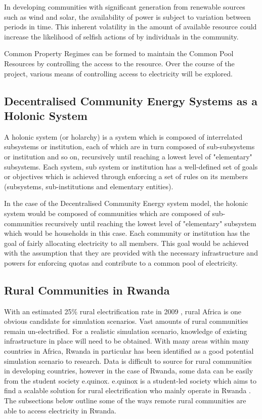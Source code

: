 \documentclass{article}
\begin{document}
In developing communities with significant generation from renewable sources such as wind and solar, the availability of power is subject to variation between periods in time. This inherent volatility in the amount of available resource could increase the likelihood of selfish actions of by individuals in the community.

Common Property Regimes can be formed to maintain the Common Pool Resources by controlling the access to the resource. Over the course of the project, various means of controlling access to electricity will be explored. 

\subsection{Decentralised Community Energy Systems as a Holonic System}
A holonic system (or holarchy) is a system which is composed of interrelated subsystems or institution, each of which are in turn composed of sub-subsystems  or institution and so on, recursively until reaching a lowest level of "elementary" subsystems. Each system, sub system or institution has a well-defined set of goals or objectives which is achieved through enforcing a set of rules on its members (subsystems, sub-institutions and elementary entities). 

In the case of the Decentralised Community Energy system model, the holonic system would be composed of communities which are composed of sub-communities recursively until reaching the lowest level of "elementary" subsystem which would be households in this case. Each community or institution has the goal of fairly allocating electricity to all members. This goal would be achieved with the assumption that they are provided with the necessary infrastructure and powers for enforcing quotas and contribute to a common pool of electricity.


\subsection{Rural Communities in Rwanda}
With an estimated 25\% rural electrification rate in 2009 \cite{IEA-web:2015}, rural Africa is one obvious candidate for simulation scenarios. Vast amounts of rural communities remain un-electrified. For a realistic simulation scenario, knowledge of existing infrastructure in place will need to be obtained. With many areas within many countries in Africa, Rwanda in particular has been identified as a good potential simulation scenario to research. Data is difficult to source for rural communities in developing countries, however in the case of Rwanda, some data can be easily from the student society e.quinox. e.quinox is a student-led society which aims to find a scalable solution for rural electrification who mainly operate in Rwanda \cite{e.quinox-web:2015}. The subsections below outline some of the ways remote rural communities are able to access electricity in Rwanda.
\end{document}
